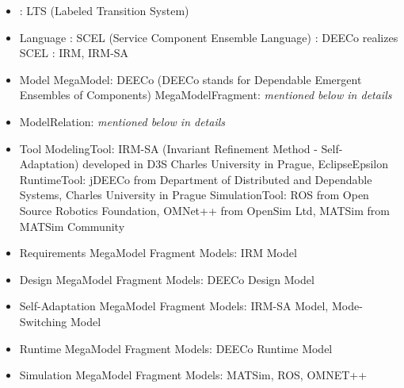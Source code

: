 \begin{itemize}
    \item {}
        \subitem {}: LTS (Labeled Transition System)
    \item Language
        \subitem {}: SCEL (Service Component Ensemble Language)
        \subitem {}: DEECo realizes SCEL
        \subitem {}: IRM, IRM-SA 
    \item Model
        \subitem MegaModel: DEECo (DEECo stands for Dependable Emergent Ensembles of Components)
        \subitem MegaModelFragment: \textit{mentioned below in details}
    \item ModelRelation: \textit{mentioned below in details}
    \item Tool
        \subitem ModelingTool: IRM-SA (Invariant Refinement Method - Self-Adaptation) developed in D3S Charles University in Prague, EclipseEpsilon
        \subitem RuntimeTool: jDEECo from Department of Distributed and Dependable Systems, Charles University in Prague
        \subitem SimulationTool: ROS from Open Source Robotics Foundation, OMNet++ from OpenSim Ltd,  MATSim from MATSim Community %
\end{itemize}


\begin{itemize}
    \item Requirements MegaModel Fragment
        \subitem Models: IRM Model 
    \item Design MegaModel Fragment
        \subitem Models: DEECo Design Model 
    \item Self-Adaptation MegaModel Fragment
        \subitem Models: IRM-SA Model, Mode-Switching Model 
    \item Runtime MegaModel Fragment
        \subitem Models: DEECo Runtime Model
    \item Simulation MegaModel Fragment
        \subitem Models: MATSim, ROS, OMNET++ %
\end{itemize}


